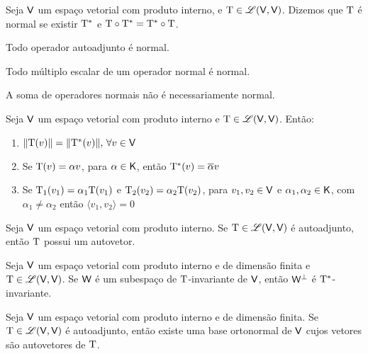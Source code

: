 \documentclass[10pt,a4paper]{book}
\begin{document}
\begin{definition}
	Seja $\mathsf{ V }$ um espaço vetorial com produto interno, e $\mathrm{ T } \in \mathscr{ L }(\mathsf{ V }, \mathsf{ V })$. Dizemos que $\mathrm{ T }$ é normal se existir $\mathrm{ T ^ *}$ e $\mathrm{ T } \circ \mathrm{ T ^ *} = \mathrm{ T ^ *} \circ \mathrm{ T }$.
\end{definition}

\begin{lemma}
	Todo operador autoadjunto é normal.
\end{lemma}

\begin{lemma}
	Todo múltiplo escalar de um operador normal é normal.
\end{lemma}

\begin{remark}
	A soma de operadores normais não é necessariamente normal.
\end{remark}

\begin{proposition}
	Seja $\mathsf{ V }$ um espaço vetorial com produto interno e $\mathrm{ T } \in \mathscr{ L }(\mathsf{ V }, \mathsf{ V })$. Então:
	\begin{enumerate}
		\item $\lVert \mathrm{ T }(v) \rVert = \lVert \mathrm{ T ^ *}(v) \rVert, \, \forall v \in \mathsf{ V }$
		\item Se $\mathrm{ T }(v) = \alpha v$, para $\alpha \in \mathsf{ K }$, então $\mathrm{ T ^ *}(v) = \overline{\alpha}v$
		\item Se $\mathrm{ T }_1(v_1) = \alpha_1 \mathrm{ T }(v_1)$ e $\mathrm{ T }_2(v_2) = \alpha_2 \mathrm{ T }(v_2)$, para $v_1, v_2 \in \mathsf{ V }$ e $\alpha_1, \alpha_2 \in \mathsf{ K }$, com $\alpha_1 \neq \alpha_2$ então $\langle v_1, v_2 \rangle = 0$
	\end{enumerate}
\end{proposition}

\begin{theorem}
	Seja $\mathsf{ V }$ um espaço vetorial com produto interno. Se $\mathrm{ T } \in \mathscr{ L }(\mathsf{ V }, \mathsf{ V })$ é autoadjunto, então $\mathrm{ T }$ possui um autovetor.
\end{theorem}

\begin{lemma}
	Seja $\mathsf{ V }$ um espaço vetorial com produto interno e de dimensão finita e $\mathrm{ T } \in \mathscr{ L }(\mathsf{ V }, \mathsf{ V })$. Se $\mathsf{ W }$ é um subespaço de $\mathrm{ T }$-invariante de $\mathsf{ V }$, então $\mathsf{ W } ^ \perp$ é  $\mathrm{ T ^ *}$-invariante.
\end{lemma}

\begin{proposition}
	Seja $\mathsf{ V }$ um espaço vetorial com produto interno e de dimensão finita. Se $\mathrm{ T } \in \mathscr{ L }(\mathsf{ V }, \mathsf{ V })$ é autoadjunto, então existe uma base ortonormal de $\mathsf{ V }$ cujos vetores são autovetores de $\mathrm{ T }$.
\end{proposition}
\end{document}
